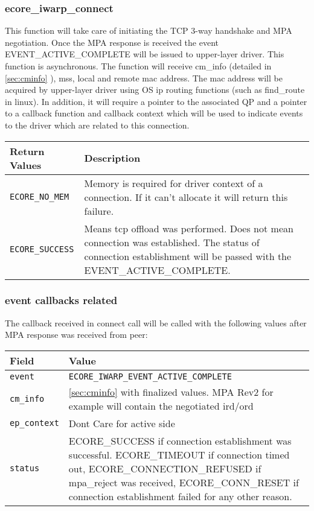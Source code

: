 \documentclass[11pt,fleqn,hidelinks,oneside]{book} %
\begin{document}
\subsubsection{ecore\_iwarp\_connect}
 This function will take care of initiating the TCP 3-way handshake and MPA negotiation. Once the MPA response is received the event EVENT\_ACTIVE\_COMPLETE will be issued to upper-layer driver. This function is asynchronous. The function will receive cm\_info (detailed in \ref{sec:cminfo} ), mss, local and remote mac address. The mac address will be acquired by upper-layer driver using OS ip routing functions (such as find\_route in linux). In addition, it will require a pointer to the associated QP and a pointer to a callback function and callback context which will be used to indicate events to the driver which are related to this connection. \newline
 \begin{tabular}{| l | p{10cm} |}
 	\hline
 	\textbf{Return Values} & \textbf{Description} \\ \hline
 	\texttt{ECORE\_NO\_MEM} & Memory is required for driver context of a connection. If it can't allocate it will return this failure. \\ \hline
 	\texttt{ECORE\_SUCCESS} & Means tcp offload was performed. Does not mean connection was established. The status of connection establishment will be passed with the EVENT\_ACTIVE\_COMPLETE. \\ \hline
\end{tabular}
\subsubsection{event callbacks related}
The callback received in connect call will be called with the following values after MPA response was received from peer: \newline
 \begin{tabular}{| l | p{10cm} |}
 	\hline
 	\textbf{Field} & \textbf{Value} \\ \hline
 	\texttt{event} & \texttt{ECORE\_IWARP\_EVENT\_ACTIVE\_COMPLETE} \\ \hline
 	\texttt{cm\_info} & \ref{sec:cminfo} with finalized values. MPA Rev2 for example will contain the negotiated ird/ord \\ \hline
 	\texttt{ep\_context} & Dont Care for active side \\ \hline
 	\texttt{status} & ECORE\_SUCCESS if connection establishment was successful. ECORE\_TIMEOUT if connection timed out, ECORE\_CONNECTION\_REFUSED if mpa\_reject was received, ECORE\_CONN\_RESET if connection establishment failed for any other reason. \\ \hline
 \end{tabular}
 	
\end{document}
